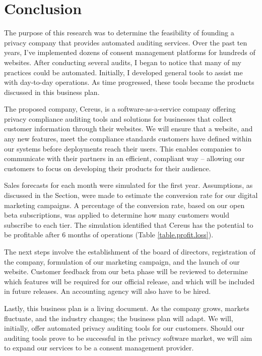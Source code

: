 {\let\cleardoublepage\relax \chapter*{Conclusion}}

The purpose of this research was to determine the feasibility of founding a privacy company that provides automated auditing services. Over the past ten years, I’ve implemented dozens of consent management platforms for hundreds of websites. After conducting several audits, I began to notice that many of my practices could be automated. Initially, I developed general tools to assist me with day-to-day operations. As time progressed, these tools became the products discussed in this business plan.

The proposed company, Cereus, is a software-as-a-service company offering privacy compliance auditing tools and solutions for businesses that collect customer information through their websites. We will ensure that a website, and any new features, meet the compliance standards customers have defined within our systems before deployments reach their users. This enables companies to communicate with their partners in an efficient, compliant way – allowing our customers to focus on developing their products for their audience.

Sales forecasts for each month were simulated for the first year. Assumptions, as discussed in the  Section, were made to estimate the conversion rate for our digital marketing campaigns. A percentage of the conversion rate, based on our open beta subscriptions, was applied to determine how many customers would subscribe to each tier. The simulation identified that Cereus has the potential to be profitable after 6 months of operations (Table \ref{table.profit.loss}).

The next steps involve the establishment of the board of directors, registration of the company, formulation of our marketing campaign, and the launch of our website. Customer feedback from our beta phase will be reviewed to determine which features will be required for our official release, and which will be included in future releases. An accounting agency will also have to be hired.

Lastly, this business plan is a living document. As the company grows, markets fluctuate, and the industry changes; the business plan will adapt. We will, initially, offer automated privacy auditing tools for our customers. Should our auditing tools prove to be successful in the privacy software market, we will aim to expand our services to be a consent management provider.